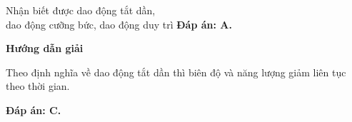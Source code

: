\begin{dang}{Nhận biết được dao động tắt dần,\\ dao động cưỡng bức, dao động duy trì}
{		\textbf{Đáp án: A.}
	}
	{\begin{center}
			\textbf{Hướng dẫn giải}
		\end{center}
		
		Theo định nghĩa về dao động tắt dần thì biên độ và năng lượng giảm liên tục theo thời gian.	
		
		\textbf{Đáp án: C.}
	}
\end{dang}
